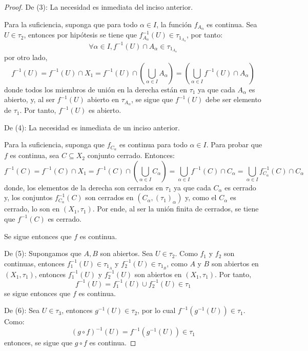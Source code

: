 \documentclass[12pt]{report}
\theoremstyle{largebreak}
\begin{document}
    \begin{proof}
        De (3): La necesidad es inmediata del inciso anterior.

        Para la suficiencia, suponga que para todo $\alpha\in I$, la función $f_{A_\alpha}$ es continua. Sea $U\in\tau_2$, entonces por hipótesis se tiene que $f_{A_\alpha}^{-1}(U)\in\tau_{1_{A_\alpha}}$, por tanto:
        \begin{equation*}
            \forall \alpha\in I, f^{-1}(U)\cap A_\alpha\in \tau_{1_{A_\alpha}}
        \end{equation*}
        por otro lado,
        \begin{equation*}
            f^{-1}(U)=f^{-1}(U)\cap X_1=f^{-1}(U)\cap\left(\bigcup_{\alpha\in I}A_\alpha \right)=\left(\bigcup_{\alpha\in I}f^{-1}(U)\cap A_\alpha \right)
        \end{equation*}
        donde todos los miembros de unión en la derecha están en $\tau_1$ ya que cada $A_\alpha$ es abierto, y, al ser $f^{-1}(U)$ abierto en $\tau_{A_\alpha}$, se sigue que $f^{-1}(U)$ debe ser elemento de $\tau_1$. Por tanto, $f^{-1}(U)$ es abierto.

        De (4): La necesidad es inmediata de un inciso anterior.

        Para la suficiencia, suponga que $f_{C_\alpha}$ es continua para todo $\alpha\in I$. Para probar que $f$ es continua, sea $C\subseteq X_2$ conjunto cerrado. Entonces:
        \begin{equation*}
            f^{-1}(C)=f^{-1}(C)\cap X_1=f^{-1}(C)\cap(\bigcup_{\alpha\in I}C_\alpha)=\bigcup_{\alpha\in I}f^{-1}(C)\cap C_\alpha=\bigcup_{\alpha\in I}f_{C_\alpha}^{-1}(C)\cap C_\alpha
        \end{equation*}
        donde, los elementos de la derecha son cerrados en $\tau_1$ ya que cada $C_\alpha$ es cerrado y, los conjuntos $f_{C_\alpha}^{-1}(C)$ son cerrados en $(C_\alpha,(\tau_1)_\alpha)$ y, como el $C_\alpha$ es cerrado, lo son en $(X_1,\tau_1)$. Por ende, al ser la unión finita de cerrados, se tiene que $f^{-1}(C)$ es cerrado.

        Se sigue entonces que $f$ es continua.

        De (5): Supongamos que $A,B$ son abiertos. Sea $U\in\tau_2$. Como $f_1$ y $f_2$ son continuas, entonces $f_1^{-1}(U)\in\tau_{1_A}$ y $f_2^{-1}(U)\in\tau_{1_B}$, como $A$ y $B$ son abiertos en $(X_1,\tau_1)$, entonces $f_1^{-1}(U)$ y $f_2^{-1}(U)$ son abiertos en $(X_1,\tau_1)$. Por tanto,
        \begin{equation*}
            f^{-1}(U)=f_1^{-1}(U)\cup f_2^{-1}(U)\in\tau_1
        \end{equation*}
        se sigue entonces que $f$ es continua.

        De (6): Sea $U\in\tau_3$, entonces $g^{-1}(U)\in \tau_2$, por lo cual $f^{-1}(g^{-1}(U))\in\tau_1$. Como:
        \begin{equation*}
            (g\circ f)^{-1}(U)=f^{-1}(g^{-1}(U))\in\tau_1
        \end{equation*}
        entonces, se sigue que $g\circ f$ es continua.
    \end{proof}
\end{document}
